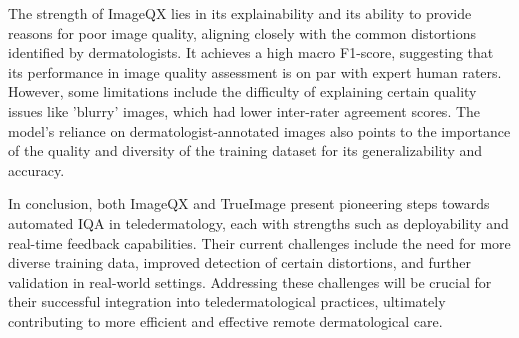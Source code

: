 \noindent
The strength of ImageQX lies in its explainability and its ability to provide reasons for poor image quality, aligning closely with the common distortions identified by dermatologists. It achieves a high macro F1-score, suggesting that its performance in image quality assessment is on par with expert human raters. However, some limitations include the difficulty of explaining certain quality issues like 'blurry' images, which had lower inter-rater agreement scores. The model's reliance on dermatologist-annotated images also points to the importance of the quality and diversity of the training dataset for its generalizability and accuracy. \par
\vspace{\baselineskip}
\noindent
In conclusion, both ImageQX and TrueImage present pioneering steps towards automated IQA in teledermatology, each with strengths such as deployability and real-time feedback capabilities. Their current challenges include the need for more diverse training data, improved detection of certain distortions, and further validation in real-world settings. Addressing these challenges will be crucial for their successful integration into teledermatological practices, ultimately contributing to more efficient and effective remote dermatological care. \par

